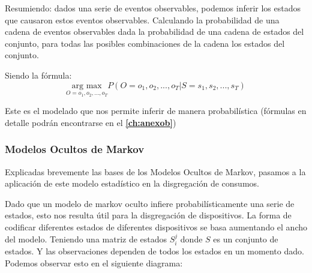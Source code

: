 Resumiendo: dados una serie de eventos observables, podemos inferir los estados que causaron estos eventos observables. Calculando la probabilidad de una cadena de eventos observables dada la probabilidad de una cadena de estados del conjunto, para todas las posibles combinaciones de la cadena los estados del conjunto. 

Siendo la fórmula:
$$
\underset{O=o_1,o_2,...,o_{T}}{\text{arg max}} P (O=o_1,o_2,...,o_{T} | S=s_1,s_2,...,s_{T})
$$

Este es el modelado que nos permite inferir de manera probabilística (fórmulas en detalle podrán encontrarse en el \textbf{\autoref{ch:anexob}})

\subsubsection{Modelos Ocultos de Markov}
Explicadas brevemente las bases de los Modelos Ocultos de Markov, pasamos a la aplicación de este modelo estadístico en la disgregación de consumos.

Dado que un modelo de markov oculto infiere probabilísticamente una serie de estados, esto nos resulta útil para la disgregación de dispositivos. La forma de codificar diferentes estados de diferentes dispositivos se basa aumentando el ancho del modelo. Teniendo una matriz de estados $S_i^j$ donde $S$ es un conjunto de estados. Y las observaciones dependen de todos los estados en un momento dado. Podemos observar esto en el siguiente diagrama:

